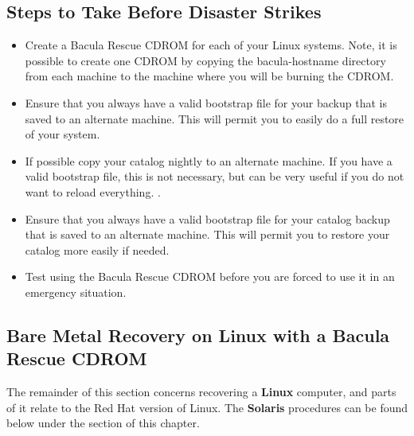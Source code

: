 \label{steps1}

\subsection*{Steps to Take Before Disaster Strikes}

\begin{itemize}
\item Create a Bacula Rescue CDROM for each of your Linux systems. Note,  it
   is possible to create one CDROM by copying the bacula-hostname  directory from
   each machine to the machine where you will be  burning the CDROM.  
\item Ensure that you always have a valid bootstrap file for your  backup that
   is saved to an alternate machine. This will permit  you to easily do a full
   restore of your system. 
\item If possible copy your catalog nightly to an alternate machine.  If you
   have a valid bootstrap file, this is not necessary, but  can be very useful if
   you do not want to reload everything. .  
\item Ensure that you always have a valid bootstrap file for your  catalog
   backup that is saved to an alternate machine. This will  permit you to restore
   your catalog more easily if needed.  
\item Test using the Bacula Rescue CDROM before you are forced to use  it in
   an emergency situation. 
   \end{itemize}

\label{rescueCDROM}

\subsection*{Bare Metal Recovery on Linux with a Bacula Rescue CDROM}

The remainder of this section concerns recovering a {\bf Linux} computer, and
parts of it relate to the Red Hat version of Linux. The {\bf Solaris}
procedures can be found below under the 
 section of this
chapter. 


